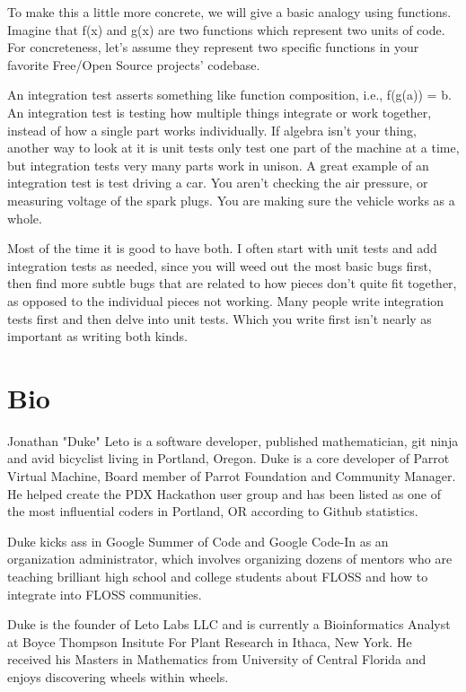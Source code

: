 To make this a little more concrete, we will give a basic analogy using functions. Imagine that f(x) and g(x) are two functions which represent two units of code. For concreteness, let's assume they represent two specific functions in your favorite Free/Open Source projects' codebase.

An integration test asserts something like function composition, i.e., f(g(a)) = b. An integration test is testing how multiple things integrate or work together, instead of how a single part works individually. If algebra isn't your thing, another way to look at it is unit tests only test one part of the machine at a time, but integration tests very many parts work in unison. A great example of an integration test is test driving a car. You aren't checking the air pressure, or measuring voltage of the spark plugs. You are making sure the vehicle works as a whole.

Most of the time it is good to have both. I often start with unit tests and add integration tests as needed, since you will weed out the most basic bugs first, then find more subtle bugs that are related to how pieces don't quite fit together, as opposed to the individual pieces not working. Many people write integration tests first and then delve into unit tests. Which you write first isn't nearly as important as writing both kinds.

\section{Bio}

Jonathan "Duke" Leto is a software developer, published mathematician, git ninja
and avid bicyclist living in Portland, Oregon. Duke is a core developer of
Parrot Virtual Machine, Board member of Parrot Foundation and Community Manager.
He helped create the PDX Hackathon user group and has been listed as one of the
most influential coders in Portland, OR according to Github statistics.

Duke kicks ass in Google Summer of Code and Google Code-In as an organization
administrator, which involves organizing dozens of mentors who are teaching
brilliant high school and college students about FLOSS and how to integrate
into FLOSS communities.

Duke is the founder of Leto Labs LLC and is currently a Bioinformatics
Analyst at Boyce Thompson Insitute For Plant Research in Ithaca, New York. He
received his Masters in Mathematics from University of Central Florida and
enjoys discovering wheels within wheels.
